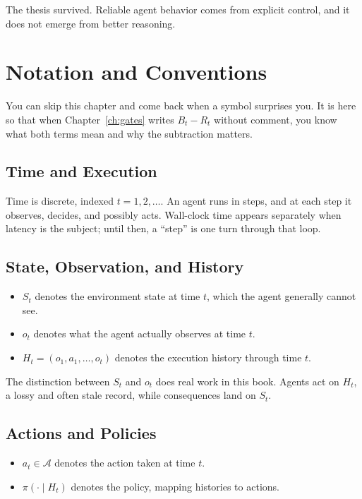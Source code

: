 \documentclass[11pt]{book}
\begin{document}
The thesis survived. Reliable agent behavior comes from explicit control, and
it does not emerge from better reasoning.

\chapter*{Notation and Conventions}

You can skip this chapter and come back when a symbol surprises you. It is here
so that when Chapter~\ref{ch:gates} writes $B_t - R_t$ without comment, you know
what both terms mean and why the subtraction matters.

\section*{Time and Execution}

Time is discrete, indexed $t = 1, 2, \ldots$. An agent runs in steps, and at
each step it observes, decides, and possibly acts. Wall-clock time appears
separately when latency is the subject; until then, a ``step'' is one turn
through that loop.

\section*{State, Observation, and History}

\begin{itemize}
\item $S_t$ denotes the environment state at time $t$, which the agent generally cannot see.
\item $o_t$ denotes what the agent actually observes at time $t$.
\item $H_t = (o_1, a_1, \ldots, o_t)$ denotes the execution history through time $t$.
\end{itemize}

The distinction between $S_t$ and $o_t$ does real work in this book. Agents act
on $H_t$, a lossy and often stale record, while consequences land on $S_t$.

\section*{Actions and Policies}

\begin{itemize}
\item $a_t \in \mathcal{A}$ denotes the action taken at time $t$.
\item $\pi(\cdot \mid H_t)$ denotes the policy, mapping histories to actions.
\end{itemize}
\end{document}
